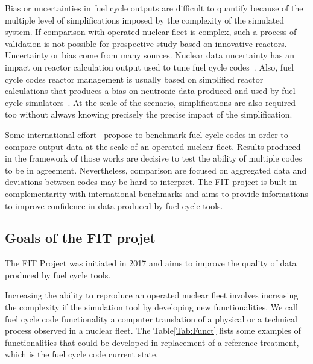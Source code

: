 Bias or uncertainties in fuel cycle outputs are difficult to quantify because of the multiple level of simplifications imposed by the complexity of the simulated system. If comparison with operated nuclear fleet is complex, such a process of validation is not possible for prospective study based on innovative reactors. Uncertainty or bias come from many sources. Nuclear data uncertainty has an impact on reactor calculation output used to tune fuel cycle codes~\cite{Krivtchik_2014}. Also, fuel cycle codes reactor management is usually based on simplified reactor calculations that produces a bias on neutronic data produced and used by fuel cycle simulators~\cite{Somaini_2017}. At the scale of the scenario, simplifications are also required too without always knowing precisely the precise impact of the simplification. 

Some international effort~\cite{NEA2016} propose to benchmark fuel cycle codes in order to compare output data at the scale of an operated nuclear fleet. Results produced in the framework of those works are decisive to test the ability of multiple codes to be in agreement. Nevertheless, comparison are focused on aggregated data and deviations between codes may be hard to interpret. The FIT project is built in complementarity with international benchmarks and aims to provide informations to improve confidence in data produced by fuel cycle tools.

\subsection{Goals of the FIT projet}

 The FIT Project was initiated in 2017 and aims to improve the
quality of data produced by fuel cycle tools. 

Increasing the ability to reproduce an operated nuclear fleet involves
increasing the complexity if the simulation tool by developing new
functionalities. We call fuel cycle code functionality a computer translation of
a physical or a technical process observed in a nuclear fleet. The
Table\ref{Tab:Funct} lists some examples of functionalities that could be
developed in replacement of a reference treatment, which is the fuel cycle code
current state.

